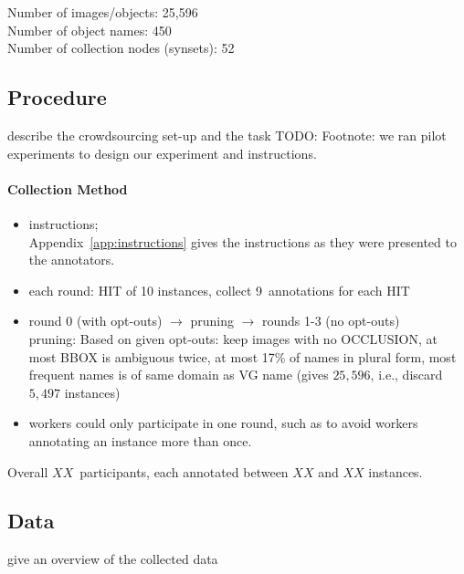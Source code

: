 Number of images/objects:        25,596\\
Number of object names:  450\\
Number of collection nodes (synsets):    52 \\

\subsection{Procedure} describe the crowdsourcing set-up and the task
TODO: Footnote: we ran pilot experiments to design our experiment and instructions.
\paragraph{Collection Method}
\begin{itemize}
	\item instructions; \\
	Appendix~\ref{app:instructions} gives the instructions as they were presented to the annotators. 
	\item each round: HIT of 10 instances, collect 9~annotations for each HIT
	\item round 0 (with opt-outs) $\rightarrow$ pruning $\rightarrow$ rounds 1-3 (no opt-outs)\\
	pruning: Based on given opt-outs: keep images with no OCCLUSION, at most BBOX is ambiguous twice, at most 17\% of names in plural form, most frequent names is of same domain as VG name (gives $25,596$, i.e., discard $5,497$ instances)
	\item workers could only participate in one round, such as to avoid workers annotating an instance more than once. 
\end{itemize}

Overall $XX$~participants, each annotated between $XX$ and $XX$ instances. 

\subsection{Data} 

give an overview of the collected data

